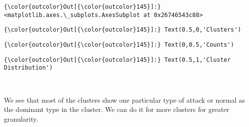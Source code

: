 \documentclass[11pt]{article}
\begin{document}
\begin{Verbatim}[commandchars=\\\{\}]
{\color{outcolor}Out[{\color{outcolor}145}]:} <matplotlib.axes.\_subplots.AxesSubplot at 0x26746543c88>
\end{Verbatim}
            
\begin{Verbatim}[commandchars=\\\{\}]
{\color{outcolor}Out[{\color{outcolor}145}]:} Text(0.5,0,'Clusters')
\end{Verbatim}
            
\begin{Verbatim}[commandchars=\\\{\}]
{\color{outcolor}Out[{\color{outcolor}145}]:} Text(0,0.5,'Counts')
\end{Verbatim}
            
\begin{Verbatim}[commandchars=\\\{\}]
{\color{outcolor}Out[{\color{outcolor}145}]:} Text(0.5,1,'Cluster Distribution')
\end{Verbatim}
            
    \begin{center}
    \end{center}
    { \hspace*{\fill} \\}
    
    We see that most of the clusters show one particular type of attack or
normal as the dominant type in the cluster. We can do it for more
clusters for greater granularity.
\end{document}
